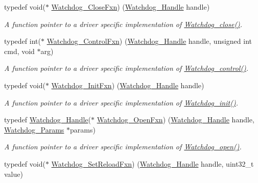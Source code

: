 \begin{DoxyCompactItemize}
typedef void($\ast$ \hyperlink{_watchdog_8h_a2d13686bc3dd7fdb05ec97d63be489ee}{Watchdog\+\_\+\+Close\+Fxn}) (\hyperlink{_watchdog_8h_a00ed22749c947ef200434eeec507f90d}{Watchdog\+\_\+\+Handle} handle)
\begin{DoxyCompactList}\small\item\em A function pointer to a driver specific implementation of \hyperlink{_watchdog_8h_a1c0dfea7011b06f303d01afb631ffbdd}{Watchdog\+\_\+close()}. \end{DoxyCompactList}\item 
typedef int($\ast$ \hyperlink{_watchdog_8h_afb5bd0153345db8f4a7a6a8756b90447}{Watchdog\+\_\+\+Control\+Fxn}) (\hyperlink{_watchdog_8h_a00ed22749c947ef200434eeec507f90d}{Watchdog\+\_\+\+Handle} handle, unsigned int cmd, void $\ast$arg)
\begin{DoxyCompactList}\small\item\em A function pointer to a driver specific implementation of \hyperlink{_watchdog_8h_aa98a75361edb1e476432669169f2950e}{Watchdog\+\_\+control()}. \end{DoxyCompactList}\item 
typedef void($\ast$ \hyperlink{_watchdog_8h_a6401b1a23d9048efb4ed69a074ea60f9}{Watchdog\+\_\+\+Init\+Fxn}) (\hyperlink{_watchdog_8h_a00ed22749c947ef200434eeec507f90d}{Watchdog\+\_\+\+Handle} handle)
\begin{DoxyCompactList}\small\item\em A function pointer to a driver specific implementation of \hyperlink{_watchdog_8h_afaadfb59be17661ae95562f2081355e7}{Watchdog\+\_\+init()}. \end{DoxyCompactList}\item 
typedef \hyperlink{_watchdog_8h_a00ed22749c947ef200434eeec507f90d}{Watchdog\+\_\+\+Handle}($\ast$ \hyperlink{_watchdog_8h_a05ae778da809a34e4d84c95d35ba5f58}{Watchdog\+\_\+\+Open\+Fxn}) (\hyperlink{_watchdog_8h_a00ed22749c947ef200434eeec507f90d}{Watchdog\+\_\+\+Handle} handle, \hyperlink{struct_watchdog___params}{Watchdog\+\_\+\+Params} $\ast$params)
\begin{DoxyCompactList}\small\item\em A function pointer to a driver specific implementation of \hyperlink{_watchdog_8h_aa5ce656aa6d5199e1efdb4ca2cd9fb7c}{Watchdog\+\_\+open()}. \end{DoxyCompactList}\item 
typedef void($\ast$ \hyperlink{_watchdog_8h_ab6ef6008c6bbc7d34b5638458e1ae5c1}{Watchdog\+\_\+\+Set\+Reload\+Fxn}) (\hyperlink{_watchdog_8h_a00ed22749c947ef200434eeec507f90d}{Watchdog\+\_\+\+Handle} handle, uint32\+\_\+t value)

\end{DoxyCompactItemize}
